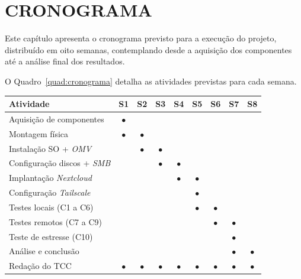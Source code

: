 
\chapter{CRONOGRAMA}
\label{cap:cronograma}

Este capítulo apresenta o cronograma previsto para a execução do projeto, distribuído em oito semanas, contemplando desde a aquisição dos componentes até a análise final dos resultados.

O Quadro~\ref{quad:cronograma} detalha as atividades previstas para cada semana.

\begin{quadro}[!h]
    \centering
    \small
    \begin{tabularx}{\linewidth}{|>{\raggedright\arraybackslash}X|c|c|c|c|c|c|c|c|}
        \hline
        \textbf{Atividade} & \textbf{S1} & \textbf{S2} & \textbf{S3} & \textbf{S4} & \textbf{S5} & \textbf{S6} & \textbf{S7} & \textbf{S8} \\
        \hline
        \hline
        Aquisição de componentes & $\bullet$ & & & & & & & \\
        \hline
        Montagem física & $\bullet$ & $\bullet$ & & & & & & \\
        \hline
        Instalação SO + \textit{OMV} & & $\bullet$ & $\bullet$ & & & & & \\
        \hline
        Configuração discos + \textit{SMB} & & & $\bullet$ & $\bullet$ & & & & \\
        \hline
        Implantação \textit{Nextcloud} & & & & $\bullet$ & $\bullet$ & & & \\
        \hline
        Configuração \textit{Tailscale} & & & & & $\bullet$ & & & \\
        \hline
        Testes locais (C1 a C6) & & & & & $\bullet$ & $\bullet$ & & \\
        \hline
        Testes remotos (C7 a C9) & & & & & & $\bullet$ & $\bullet$ & \\
        \hline
        Teste de estresse (C10) & & & & & & & $\bullet$ & \\
        \hline
        Análise e conclusão & & & & & & & $\bullet$ & $\bullet$ \\
        \hline
        Redação do TCC & $\bullet$ & $\bullet$ & $\bullet$ & $\bullet$ & $\bullet$ & $\bullet$ & $\bullet$ & $\bullet$ \\
        \hline
    \end{tabularx}
    \vspace{0.2cm}
    \fonteautoria
\end{quadro}

